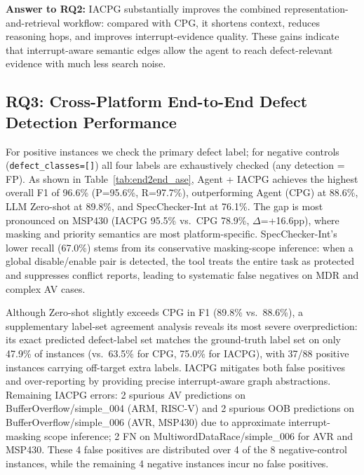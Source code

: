 \documentclass[conference]{IEEEtran}
\begin{document}
\begin{rqbox}
\textbf{Answer to RQ2:}
IACPG substantially improves the combined representation-and-retrieval workflow: compared with CPG, it shortens context, reduces reasoning hops, and improves interrupt-evidence quality. These gains indicate that interrupt-aware semantic edges allow the agent to reach defect-relevant evidence with much less search noise.
\end{rqbox}


\subsection{RQ3: Cross-Platform End-to-End Defect Detection Performance}

For positive instances we check the primary defect label; for negative controls (\texttt{defect\_classes=[]}) all four labels are exhaustively checked (any detection = FP). As shown in Table~\ref{tab:end2end_ase}, Agent + IACPG achieves the highest overall F1 of 96.6\% (P=95.6\%, R=97.7\%), outperforming Agent (CPG) at 88.6\%, LLM Zero-shot at 89.8\%, and SpecChecker-Int at 76.1\%. The gap is most pronounced on MSP430 (IACPG 95.5\% vs.\ CPG 78.9\%, $\Delta$=+16.6pp), where masking and priority semantics are most platform-specific. SpecChecker-Int's lower recall (67.0\%) stems from its conservative masking-scope inference: when a global disable/enable pair is detected, the tool treats the entire task as protected and suppresses conflict reports, leading to systematic false negatives on MDR and complex AV cases.

Although Zero-shot slightly exceeds CPG in F1 (89.8\% vs.\ 88.6\%), a supplementary label-set agreement analysis reveals its most severe overprediction: its exact predicted defect-label set matches the ground-truth label set on only 47.9\% of instances (vs.\ 63.5\% for CPG, 75.0\% for IACPG), with 37/88 positive instances carrying off-target extra labels. IACPG mitigates both false positives and over-reporting by providing precise interrupt-aware graph abstractions. Remaining IACPG errors: 2 spurious AV predictions on BufferOverflow/simple\_004 (ARM, RISC-V) and 2 spurious OOB predictions on BufferOverflow/simple\_006 (AVR, MSP430) due to approximate interrupt-masking scope inference; 2 FN on MultiwordDataRace/simple\_006 for AVR and MSP430. These 4 false positives are distributed over 4 of the 8 negative-control instances, while the remaining 4 negative instances incur no false positives.
\end{document}
